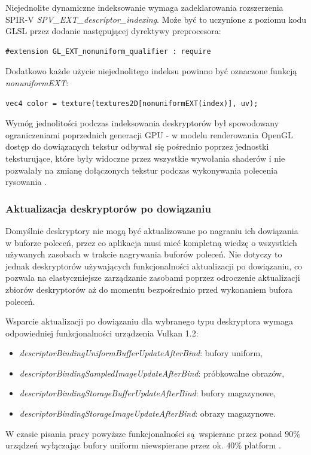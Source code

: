 Niejednolite dynamiczne indeksowanie wymaga zadeklarowania rozszerzenia SPIR-V \textit{SPV\_EXT\_descriptor\_indexing}.
Może być to uczynione z poziomu kodu GLSL przez dodanie następującej dyrektywy preprocesora:
\lstset{language=GLSL}
\begin{lstlisting}[caption={Dyrektywa preprocesora dla niejednolitych indeksów},captionpos=b]
#extension GL_EXT_nonuniform_qualifier : require
\end{lstlisting}
Dodatkowo każde użycie niejednolitego indeksu powinno być oznaczone funkcją \textit{nonuniformEXT}:
\lstset{language=GLSL}
\begin{lstlisting}[caption={Próbkowanei używając niejednolitego indeksu},captionpos=b]
vec4 color = texture(textures2D[nonuniformEXT(index)], uv);
\end{lstlisting}

Wymóg jednolitości podczas indeksowania deskryptorów był spowodowany ograniczeniami poprzednich generacji GPU - w modelu renderowania OpenGL dostęp do dowiązanych tekstur odbywał się pośrednio poprzez jednostki teksturujące, które były widoczne przez wszystkie wywołania shaderów i nie pozwalały na zmianę dołączonych tekstur podczas wykonywania polecenia rysowania \cite{GPUGEM4}. 

\subsubsection {Aktualizacja deskryptorów po dowiązaniu}

Domyślnie deskryptory nie mogą być aktualizowane po nagraniu ich dowiązania w buforze poleceń, przez co aplikacja musi mieć kompletną wiedzę o wszystkich używanych zasobach w trakcie nagrywania buforów poleceń.
Nie dotyczy to jednak deskryptorów używających funkcjonalności aktualizacji po dowiązaniu, co pozwala na elastyczniejsze zarządzanie zasobami poprzez odroczenie aktualizacji zbiorów deskryptorów aż do momentu bezpośrednio przed wykonaniem bufora poleceń.

Wsparcie aktualizacji po dowiązaniu dla wybranego typu deskryptora wymaga odpowiedniej funkcjonalności urządzenia Vulkan 1.2:
\begin{itemize}
	\item {\textit{descriptorBindingUniformBufferUpdateAfterBind}}: bufory uniform,
	\item {\textit{descriptorBindingSampledImageUpdateAfterBind}}: próbkowalne obrazów,
	\item {\textit{descriptorBindingStorageBufferUpdateAfterBind}}: bufory magazynowe,
	\item {\textit{descriptorBindingStorageImageUpdateAfterBind}}: obrazy magazynowe.
\end{itemize}
W czasie pisania pracy powyższe funkcjonalności są wspierane przez ponad $90\%$ urządzeń wyłączając bufory uniform niewspierane przez ok. $40\%$ platform \cite{GPUINFO}.

